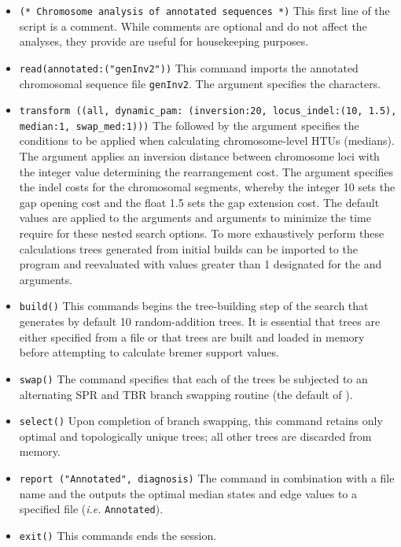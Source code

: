 \begin{itemize}
\item \texttt{(* Chromosome analysis of annotated sequences  *)} This first line of the script is a comment. While comments are optional and do not affect the analyses, they provide are useful for housekeeping purposes.
\item \texttt{read(annotated:("genInv2"))} This command imports the annotated chromosomal sequence file \texttt{genInv2}. The argument  specifies the characters. 
\item \texttt{transform ((all, dynamic\_pam: (inversion:20, locus\_indel:(10, 1.5), median:1, swap\_med:1)))}  The  followed by the argument  specifies the conditions to be applied when calculating chromosome-level HTUs (medians).  The argument  applies an inversion distance between chromosome loci with the integer value determining the rearrangement cost. The argument  specifies the indel costs for the chromosomal segments, whereby the integer 10 sets the gap opening cost and the float 1.5 sets the gap extension cost.  The default values are applied to the arguments    and  arguments to minimize the time require for these nested search options.   To more exhaustively perform these calculations trees generated from initial builds can be imported to the program and reevaluated with values greater than 1 designated for the  and  arguments.
\item \texttt{build()} This commands begins the tree-building step of the search that generates by default 10 random-addition trees.  It is essential that trees are either specified from a file or that trees are built and loaded in memory before attempting to calculate bremer support values.
\item \texttt{swap()} The  command specifies that each of the trees be subjected to an alternating SPR and TBR branch swapping routine (the default of \poy).
\item \texttt{select()} Upon completion of branch swapping, this command retains only optimal and topologically unique trees; all other trees are discarded from memory. 
\item \texttt{report ("Annotated", diagnosis)}  The  command in combination with a file name and the  outputs the optimal median states and edge values to a specified file (\emph{i.e.} \texttt{Annotated}). 
\item \texttt{exit()} This commands ends the \poy session.
\end{itemize}


